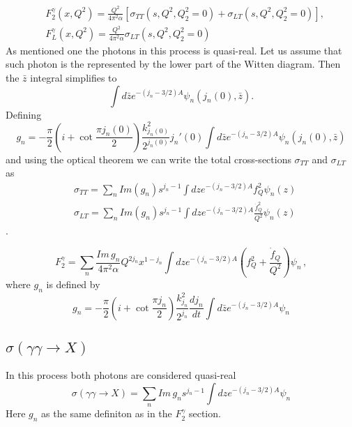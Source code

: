 \documentclass[preprint, 12pt]{elsarticle}
\begin{document}
\begin{align}
	\label{eq:F2_def}
	&F_2^{\gamma} \left(x, Q^2\right) = \frac{Q^2}{4 \pi^2 \alpha} \left[ \sigma_{TT}\left(s, Q^2, Q_2^2 = 0\right) +   \sigma_{LT}\left(s, Q^2, Q_2^2 = 0\right)\right] , \\
	&F_L^{\gamma} \left(x, Q^2\right) = \frac{Q^2}{4 \pi^2 \alpha} \sigma_{LT}\left(s, Q^2, Q_2^2 = 0\right)
\end{align}
As mentioned one the photons in this process is quasi-real. Let us assume that such photon is the represented by the lower part of the Witten diagram. Then the $\bar{z}$ integral simplifies to 
\begin{equation}
\int d\bar{z} e^{- \left(j_n - 3/2\right) A} \psi_n \left(j_n\left(0\right), \bar{z}\right).
\end{equation}
Defining
\begin{equation}
g_n = - \frac{\pi}{2} \left( i + \cot \frac{\pi j_n\left(0\right)}{2} \right) \frac{k^2_{j_n\left(0\right)}}{2^{j_n\left(0\right)}} j_n'\left(0\right) \int d\bar{z} e^{- \left(j_n - 3/2\right) A} \psi_n \left(j_n\left(0\right), \bar{z}\right)
\end{equation}
and using the optical theorem we can write the total cross-sections $\sigma_{TT}$ and $\sigma_{LT}$ as
\begin{align}
&\sigma_{TT} =  \sum_n Im\left(g_n\right) s^{j_n - 1} \int dz e^{-\left(j_n - 3/2\right) A} f_Q^2 \psi_n\left(z\right) \\
&\sigma_{LT} =  \sum_n  Im\left(g_n\right) s^{j_n - 1} \int dz e^{-\left(j_n - 3/2\right) A} \frac{\dot{f}_Q^2}{Q^2} \psi_n\left(z\right)
\end{align}.

\begin{equation}
F_2^\gamma = \sum_n \frac{ Im \, g_n}{4 \pi^2 \alpha} Q^{2 j_n} x^{1- j_n} \int dz e^{- \left( j_n - 3/2\right) A} \left( f_Q^2 + \frac{\dot{f}_Q}{Q^2} \right) \psi_n \, ,
\end{equation}
where $g_n$ is defined by
\begin{equation}
g_n = - \frac{\pi}{2} \left( i + \cot \frac{\pi j_n}{2} \right) \frac{k^2_{j_n}}{2^{j_n}} \frac{d j_n}{dt} \int d\bar{z} e^{-\left(j_n - 3/2 \right)A} \psi_n
\end{equation}
\subsection{$\sigma\left(\gamma \gamma \rightarrow X\right)$}
In this process both photons are considered quasi-real
\begin{equation}
\sigma\left(\gamma \gamma \rightarrow X\right) = \sum_n Im \, g_n s^{j_n - 1} \int dz e^{- \left( j_n - 3/2\right) A}  \psi_n
\end{equation}
Here $g_n$ as the same definiton as in the $F_2^\gamma$ section.
\end{document}
